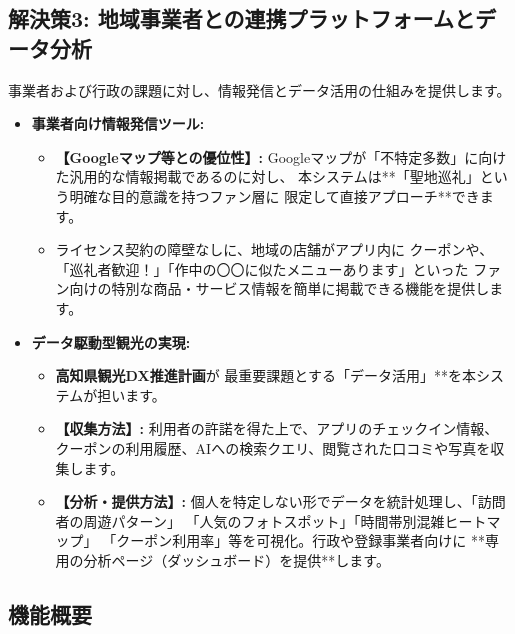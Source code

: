 \documentclass{docs}
\begin{document}
\subsection{解決策3: 地域事業者との連携プラットフォームとデータ分析}
事業者および行政の課題に対し、情報発信とデータ活用の仕組みを提供します。
\begin{itemize}
    \item \textbf{事業者向け情報発信ツール:}
    \begin{itemize}
        \item \textbf{【Googleマップ等との優位性】:}
        Googleマップが「不特定多数」に向けた汎用的な情報掲載であるのに対し、
        本システムは**「聖地巡礼」という明確な目的意識を持つファン層に
        限定して直接アプローチ**できます。
        \item ライセンス契約\cite{nri2024}の障壁なしに、地域の店舗がアプリ内に
        クーポンや、「巡礼者歓迎！」「作中の〇〇に似たメニューあります」といった
        ファン向けの特別な商品・サービス情報を簡単に掲載できる機能を提供します。
    \end{itemize}
    \item \textbf{データ駆動型観光の実現:}
    \begin{itemize}
        \item \textbf{高知県観光DX推進計画\cite{kochi_dx_plan}}が
        最重要課題とする「データ活用」**を本システムが担います。
        \item \textbf{【収集方法】:}
        利用者の許諾を得た上で、アプリのチェックイン情報、
        クーポンの利用履歴、AIへの検索クエリ、閲覧された口コミや写真を収集します。
        \item \textbf{【分析・提供方法】:}
        個人を特定しない形でデータを統計処理し、「訪問者の周遊パターン」
        「人気のフォトスポット」「時間帯別混雑ヒートマップ」
        「クーポン利用率」等を可視化。行政や登録事業者向けに
        **専用の分析ページ（ダッシュボード）を提供**します。
    \end{itemize}
\end{itemize}

\subsection{機能概要}
\end{document}
